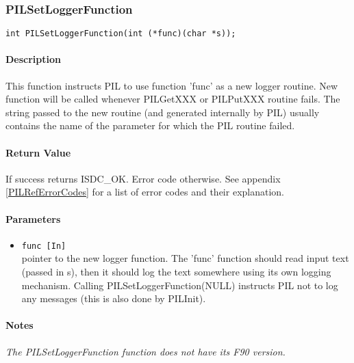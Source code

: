 
\subsubsection{PILSetLoggerFunction}\label{PILSetLoggerFunction}

\begin{verbatim}
int PILSetLoggerFunction(int (*func)(char *s)); 
\end{verbatim}

\paragraph{Description\\}
This function instructs PIL to use function 'func' as a new logger
routine. New function will be called whenever PILGetXXX or PILPutXXX
routine fails. The string passed to the new routine (and generated
internally by PIL) usually contains the name of the parameter 
for which the PIL routine failed.

\paragraph{Return Value\\}
If success returns ISDC\_OK. Error code otherwise. See appendix \ref{PILRefErrorCodes}
for a list of error codes and their explanation.

\paragraph{Parameters}
\begin{itemize}
\item
{\tt func [In] } \\
pointer to the new logger function. The 'func' function
should read input text (passed in s), then it should log 
the text somewhere using its own logging mechanism.
Calling PILSetLoggerFunction(NULL) instructs PIL not
to log any messages (this is also done by PILInit).
\end{itemize}

\paragraph{Notes\\}
{\it
The PILSetLoggerFunction function does not have its F90 version.
}



